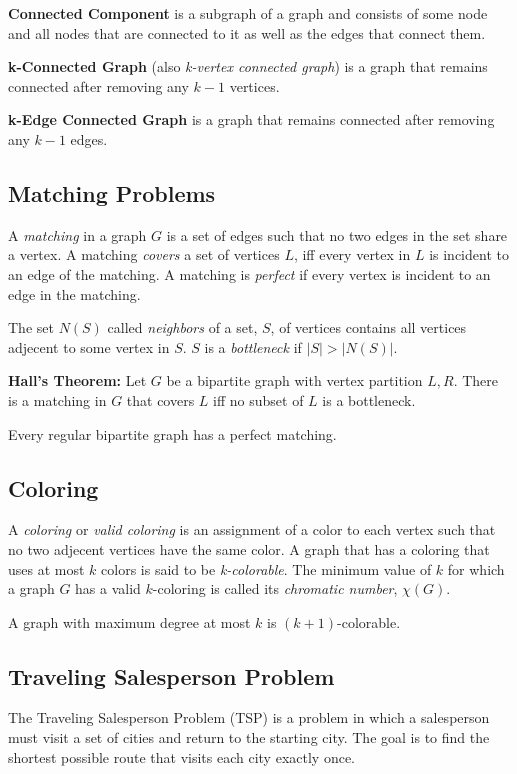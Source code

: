 \documentclass[../main.tex]{subfiles}
\begin{document}
\textbf{Connected Component} is a subgraph of a graph and consists of some node and all nodes that are connected to it as well as the edges that connect them.

\textbf{k-Connected Graph} (also \textit{k-vertex connected graph}) is a graph that remains connected after removing any $k-1$ vertices.

\textbf{k-Edge Connected Graph} is a graph that remains connected after removing any $k-1$ edges.

\subsection{Matching Problems}

A \textit{matching} in a graph $G$ is a set of edges such that no two edges in the set share a vertex. A matching \textit{covers} a set of vertices $L$, iff every vertex in $L$ is incident to an edge of the matching. A matching is \textit{perfect} if every vertex is incident to an edge in the matching.

The set $N(S)$ called \textit{neighbors} of a set, $S$, of vertices contains all vertices adjecent to some vertex in $S$. $S$ is a \textit{bottleneck} if $|S| > |N(S)|$.

\textbf{Hall's Theorem:}
Let $G$ be a bipartite graph with vertex partition $L, R$. There is a matching in $G$ that covers $L$ iff no subset of $L$ is a bottleneck.

Every regular bipartite graph has a perfect matching.

\subsection{Coloring}

A \textit{coloring} or \textit{valid coloring} is an assignment of a color to each vertex such that no two adjecent vertices have the same color. A graph that has a coloring that uses at most $k$ colors is said to be \textit{k-colorable}. The minimum value of $k$ for which a graph $G$ has a valid $k$-coloring is called its \textit{chromatic number}, $\chi(G)$.

A graph with maximum degree at most $k$ is $(k+1)$-colorable. 

\subsection{Traveling Salesperson Problem}

The Traveling Salesperson Problem (TSP) is a problem in which a salesperson must visit a set of cities and return to the starting city. The goal is to find the shortest possible route that visits each city exactly once.
\end{document}
